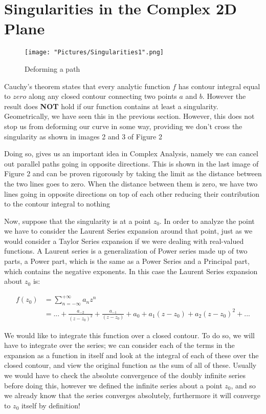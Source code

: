 \documentclass[12pt, letterpaper]{article}
\begin{document}
\section*{Singularities in the Complex 2D Plane}

\begin{figure}[h]
    \centering
    \texttt{[image: "Pictures/Singularities1".png]}
    \caption{Deforming a path}
    \label{fig:my_label2}
\end{figure}

\noindent
Cauchy's theorem  states that every analytic function \(f\) has contour integral equal to \(zero\) along any closed contour connecting two points \(a\) and \(b\). However the result does \textbf{NOT} hold if our function contains at least a singularity. Geometrically, we have seen this in the previous section. However, this does not stop us from deforming our curve in some way, providing we don't cross the singularity as shown in images 2 and 3 of Figure 2
\bigskip

\noindent
Doing so, gives us an important idea in Complex Analysis, namely we can cancel out parallel paths going in opposite directions. This is shown in the last image of Figure 2 and can be proven rigorously by taking the limit as the distance between the two lines goes to zero. When the distance between them is zero, we have two lines going in opposite directions on top of each other reducing their contribution to the contour integral to nothing 
\bigskip

\noindent
Now, suppose that the singularity is at a point \(z_{0}\). In order to analyze the point we have to consider the Laurent Series expansion around that point, just as we would consider a Taylor Series expansion if we were dealing with real-valued functions. A Laurent series is a generalization of Power series made up of two parts, a Power part, which is the same as a Power Series and a Principal part, which contains the negative exponents. In this case the Laurent Series expansion about \(z_{0}\) is:

\begin{align*}
f(z_{0}) &= \sum_{n=-\infty}^{+\infty} a_{n}z^{n}  \\
&= ... + \frac{a_{-2}}{(z-z_{0})^2} + \frac{a_{-1}}{(z-z_{0})} + a_{0} + a_{1}(z-z_{0}) + a_{2}(z-z_{0})^2 + ...
\end{align*}

\noindent
We would like to integrate this function over a closed contour. To do so, we will have to integrate over the series; we can consider each of the terms in the expansion as a function in itself and look at the integral of each of these over the closed contour, and view the original function as the sum of all of these. Usually we would have to check the absolute convergence of the doubly infinite series before doing this, however we defined the infinite series about a point \(z_{0}\), and so we already know that the series converges absolutely, furthermore it will converge to \(z_{0}\) itself by definition!
\bigskip
\end{document}
